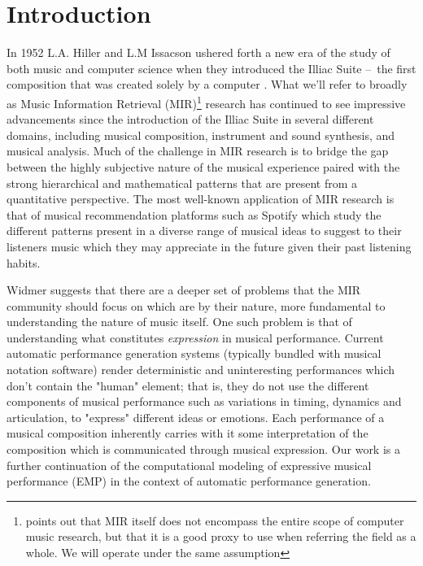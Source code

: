 \chapter{Introduction} \label{ch:introduction}

In 1952 L.A. Hiller and L.M Issacson ushered forth a new era of the study of both music and computer science when they introduced the Illiac Suite – the first composition that was created solely by a computer \cite{sandred2009revisiting}. What we'll refer to broadly as Music Information Retrieval (MIR)\footnote{\citet{widmer2016getting} points out that MIR itself does not encompass the entire scope of computer music research, but that it is a good proxy to use when referring the field as a whole. We will operate under the same assumption} research has continued to see impressive advancements since the introduction of the Illiac Suite in several different domains, including musical composition\cite{briot2017deep}, instrument and sound synthesis\cite{engel2017neural}, and musical analysis\cite{widmer2016getting}. Much of the challenge in MIR research is to bridge the gap between the highly subjective nature of the musical experience paired with the strong hierarchical and mathematical patterns that are present from a quantitative perspective. The most well-known application of MIR research is that of musical recommendation platforms such as Spotify which study the different patterns present in a diverse range of musical ideas to suggest to their listeners music which they may appreciate in the future given their past listening habits. 

Widmer\cite{widmer2016getting} suggests that there are a deeper set of problems that the MIR community should focus on which are by their nature, more fundamental to understanding the nature of music itself. One such problem is that of understanding what constitutes \emph{expression} in musical performance. Current automatic performance generation systems (typically bundled with musical notation software) render deterministic and uninteresting performances which don't contain the "human" element; that is, they do not use the different components of musical performance such as variations in timing, dynamics and articulation, to "express" different ideas or emotions. Each performance of a musical composition inherently carries with it some interpretation of the composition which is communicated through musical expression. Our work is a further continuation of the computational modeling of expressive musical performance (EMP) in the context of automatic performance generation. 

